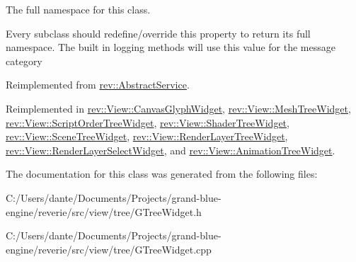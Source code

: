 The full namespace for this class. 

Every subclass should redefine/override this property to return its full namespace. The built in logging methods will use this value for the message category 

Reimplemented from \mbox{\hyperlink{classrev_1_1_abstract_service_a062e932eaa2eab0109288f2b32e459f7}{rev\+::\+Abstract\+Service}}.



Reimplemented in \mbox{\hyperlink{classrev_1_1_view_1_1_canvas_glyph_widget_ace5c69a8e1f338fc0571f98a7329a64d}{rev\+::\+View\+::\+Canvas\+Glyph\+Widget}}, \mbox{\hyperlink{classrev_1_1_view_1_1_mesh_tree_widget_a9051050a76f3eb339fe8eacfac5806ca}{rev\+::\+View\+::\+Mesh\+Tree\+Widget}}, \mbox{\hyperlink{classrev_1_1_view_1_1_script_order_tree_widget_aeffcb37cdb2f9745d92b74c0ed73aebd}{rev\+::\+View\+::\+Script\+Order\+Tree\+Widget}}, \mbox{\hyperlink{classrev_1_1_view_1_1_shader_tree_widget_a34120d5ac0a72d1bc042f1933d11e984}{rev\+::\+View\+::\+Shader\+Tree\+Widget}}, \mbox{\hyperlink{classrev_1_1_view_1_1_scene_tree_widget_a8d388e6e5f396f5641a92a29fb42bf6c}{rev\+::\+View\+::\+Scene\+Tree\+Widget}}, \mbox{\hyperlink{classrev_1_1_view_1_1_render_layer_tree_widget_abf815dc334dc567b1d9defe2ed24efc6}{rev\+::\+View\+::\+Render\+Layer\+Tree\+Widget}}, \mbox{\hyperlink{classrev_1_1_view_1_1_render_layer_select_widget_a3f7f6f78fbfdc91168b7d1c762ecb0af}{rev\+::\+View\+::\+Render\+Layer\+Select\+Widget}}, and \mbox{\hyperlink{classrev_1_1_view_1_1_animation_tree_widget_a7e4693a9bee6d2ed28da121609ac82ec}{rev\+::\+View\+::\+Animation\+Tree\+Widget}}.



The documentation for this class was generated from the following files\+:\begin{DoxyCompactItemize}
\item 
C\+:/\+Users/dante/\+Documents/\+Projects/grand-\/blue-\/engine/reverie/src/view/tree/G\+Tree\+Widget.\+h\item 
C\+:/\+Users/dante/\+Documents/\+Projects/grand-\/blue-\/engine/reverie/src/view/tree/G\+Tree\+Widget.\+cpp\end{DoxyCompactItemize}

